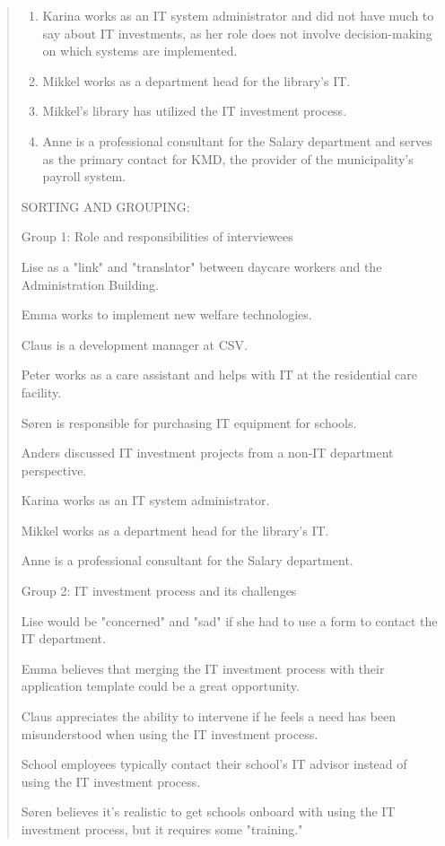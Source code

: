 \documentclass[
]{book}
\begin{document}
\begin{quote}
\begin{enumerate}
\item
  Karina works as an IT system administrator and did not have much to say about IT investments, as her role does not involve decision-making on which systems are implemented.
\item
  Mikkel works as a department head for the library's IT.
\item
  Mikkel's library has utilized the IT investment process.
\item
  Anne is a professional consultant for the Salary department and serves as the primary contact for KMD, the provider of the municipality's payroll system.
\end{enumerate}

SORTING AND GROUPING:

Group 1: Role and responsibilities of interviewees

Lise as a "link" and "translator" between daycare workers and the Administration Building.

Emma works to implement new welfare technologies.

Claus is a development manager at CSV.

Peter works as a care assistant and helps with IT at the residential care facility.

Søren is responsible for purchasing IT equipment for schools.

Anders discussed IT investment projects from a non-IT department perspective.

Karina works as an IT system administrator.

Mikkel works as a department head for the library's IT.

Anne is a professional consultant for the Salary department.

Group 2: IT investment process and its challenges

Lise would be "concerned" and "sad" if she had to use a form to contact the IT department.

Emma believes that merging the IT investment process with their application template could be a great opportunity.

Claus appreciates the ability to intervene if he feels a need has been misunderstood when using the IT investment process.

School employees typically contact their school's IT advisor instead of using the IT investment process.

Søren believes it's realistic to get schools onboard with using the IT investment process, but it requires some "training."


\end{quote}
\end{document}
